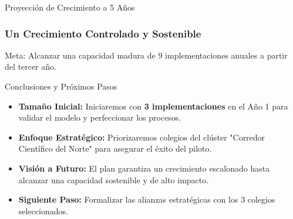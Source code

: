 \begin{frame}{Proyección de Crecimiento a 5 Años}
    \frametitle{Un Crecimiento Controlado y Sostenible}
    
    \begin{table}
    \centering
    \caption{Proyección de crecimiento hasta alcanzar la capacidad madura del proyecto.}
    \end{table}
    
    \vfill
    \begin{alertblock}{}
        Meta: Alcanzar una capacidad madura de 9 implementaciones anuales a partir del tercer año.
    \end{alertblock}
\end{frame}

\begin{frame}{Conclusiones y Próximos Pasos}
    \begin{itemize}
        \item \textbf{Tamaño Inicial:} Iniciaremos con \textbf{3 implementaciones} en el Año 1 para validar el modelo y perfeccionar los procesos.
        \item \textbf{Enfoque Estratégico:} Priorizaremos colegios del clúster "Corredor Científico del Norte" para asegurar el éxito del piloto.
        \item \textbf{Visión a Futuro:} El plan garantiza un crecimiento escalonado hasta alcanzar una capacidad sostenible y de alto impacto.
        \item \textbf{Siguiente Paso:} Formalizar las alianzas estratégicas con los 3 colegios seleccionados.
    \end{itemize}
\end{frame}

